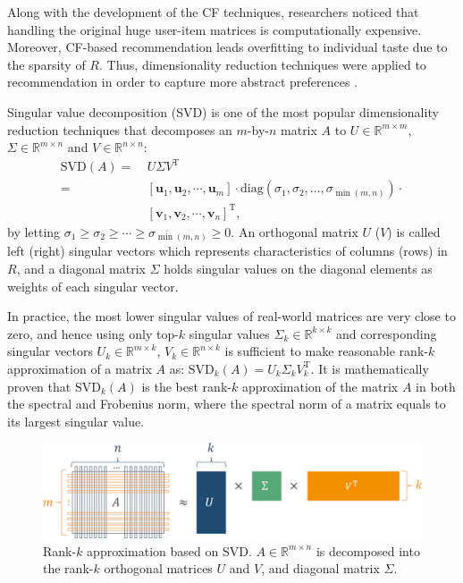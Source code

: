 Along with the development of the CF techniques, researchers noticed that handling the original huge user-item matrices is computationally expensive. Moreover, CF-based recommendation leads overfitting to individual taste due to the sparsity of $R$. Thus, dimensionality reduction techniques were applied to recommendation in order to capture more abstract preferences \cite{Sarwar2000}.

Singular value decomposition (SVD) is one of the most popular dimensionality reduction techniques that decomposes an $m$-by-$n$ matrix $A$ to $U \in \mathbb{R}^{m \times m}$, $\Sigma \in \mathbb{R}^{m \times n}$ and $V \in \mathbb{R}^{n \times n}$: 
\begin{align*}
\mathrm{SVD}(A) =& \ U \Sigma V^{\mathrm{T}} \\ 
= & \ \left[\mathbf{u}_1, \mathbf{u}_2, \cdots, \mathbf{u}_m\right] \cdot \mathrm{diag}\left(\sigma_1, \sigma_2, \dots, \sigma_{\min(m, n)}\right) \cdot \\
& \ \left[\mathbf{v}_1, \mathbf{v}_2, \cdots, \mathbf{v}_n\right]^{\mathrm{T}},
\end{align*}
by letting $\sigma_1 \geq \sigma_2 \geq \cdots \geq \sigma_{\min(m, n)} \geq 0$. An orthogonal matrix $U$ ($V$) is called left (right) singular vectors which represents characteristics of columns (rows) in $R$, and a diagonal matrix $\Sigma$ holds singular values on the diagonal elements as weights of each singular vector.

In practice, the most lower singular values of real-world matrices are very close to zero, and hence using only top-$k$ singular values $\Sigma_k \in \mathbb{R}^{k \times k}$ and corresponding singular vectors $U_k \in \mathbb{R}^{m \times k}$, $V_k \in \mathbb{R}^{n \times k}$ is sufficient to make reasonable rank-$k$ approximation of a matrix $A$ as: $\mathrm{SVD}_k(A) = U_k \Sigma_k V_k^{\mathrm{T}}$. It is mathematically proven that $\mathrm{SVD}_k(A)$ is the best rank-$k$ approximation of the matrix $A$ in both the spectral and Frobenius norm, where the spectral norm of a matrix equals to its largest singular value.

\begin{figure}[htbp]
  \centering
  \includegraphics[width=1.0\linewidth]{images/svd.pdf}
  \caption{Rank-$k$ approximation based on SVD. $A \in \mathbb{R}^{m \times n}$ is decomposed into the rank-$k$ orthogonal matrices $U$ and $V$, and diagonal matrix $\Sigma$.}
  \label{fig:svd}
\end{figure}

